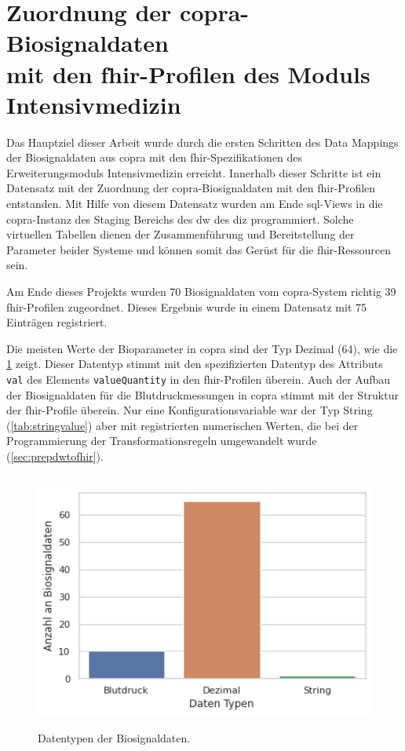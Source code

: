\section[Zuordnung der \acs{copra}-Biosignaldaten mit den \acs{fhir}-Profilen des Moduls \glqq Intensivmedizin\grqq{}]{Zuordnung der \acs{copra}-Biosignaldaten \\ mit den \acs{fhir}-Profilen des Moduls \glqq Intensivmedizin\grqq{}} \label{sect:resdatamapping}

Das Hauptziel dieser Arbeit wurde durch die ersten Schritten des Data Mappings der Biosignaldaten aus \ac{copra} mit den \ac{fhir}-Spezifikationen des Erweiterungsmoduls \glqq Intensivmedizin\grqq{} erreicht. Innerhalb dieser Schritte ist ein Datensatz mit der Zuordnung der \ac{copra}-Biosignaldaten mit den \ac{fhir}-Profilen entstanden. Mit Hilfe von diesem Datensatz wurden am Ende \ac{sql}-Views in die \ac{copra}-Instanz des Staging Bereichs des \ac{dw} des \ac{diz} programmiert. Solche virtuellen Tabellen dienen der Zusammenführung und Bereitstellung der Parameter beider Systeme und können somit das Gerüst für die \ac{fhir}-Ressourcen sein.

Am Ende dieses Projekts wurden 70 Biosignaldaten vom \ac{copra}-System richtig 39 \ac{fhir}-Profilen zugeordnet. Dieses Ergebnis wurde in einem Datensatz mit 75 Einträgen registriert.

Die meisten Werte der Bioparameter in \ac{copra} sind der Typ Dezimal (64), wie die \ref{fig:signaldatatyps} zeigt. Dieser Datentyp stimmt mit den spezifizierten Datentyp des Attributs \texttt{val} des Elements \texttt{valueQuantity} in den \ac{fhir}-Profilen überein. Auch der Aufbau der Biosignaldaten für die Blutdruckmessungen in \ac{copra} stimmt mit der Struktur der \ac{fhir}-Profile überein. Nur eine Konfigurationsvariable war der Typ String (\ref{tab:stringvalue}) aber mit registrierten numerischen Werten, die bei der Programmierung der Transformationsregeln umgewandelt wurde (\ref{sec:prepdwtofhir}).

\begin{figure}[ht]
	\centering
	\includegraphics[height=8.5cm]{figures/biosignal_data_types}
	\caption[Datentypen der Biosignaldaten]{Datentypen der Biosignaldaten.}
	\label{fig:signaldatatyps}
\end{figure}

